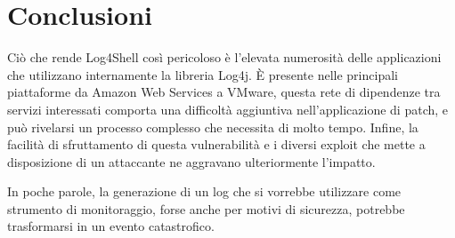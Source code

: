 \documentclass[a4paper, 12pt]{article}
\begin{document}
\newpage

\section{Conclusioni}
Ciò che rende Log4Shell così pericoloso è l'elevata numerosità delle applicazioni che utilizzano internamente la libreria Log4j.
È presente nelle principali piattaforme da Amazon Web Services a VMware, questa rete di dipendenze tra servizi interessati comporta una difficoltà aggiuntiva nell’applicazione di patch, e può rivelarsi un processo complesso che necessita di molto tempo.
Infine, la facilità di sfruttamento di questa vulnerabilità e i diversi exploit che mette a disposizione di un attaccante ne aggravano ulteriormente l’impatto. 

In poche parole, la generazione di un log che si vorrebbe utilizzare come strumento di monitoraggio, forse anche per motivi  di sicurezza, potrebbe trasformarsi in un evento catastrofico.

\newpage


\nocite{*}

\end{document}
